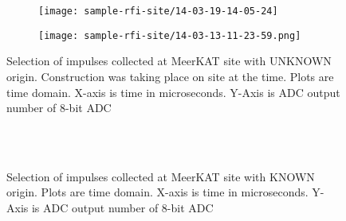 \begin{landscape}
\begin{figure}
{\begin{subfigure}{0.55\textwidth}
      \texttt{[image: sample-rfi-site/14-03-19-14-05-24]}
    \end{subfigure}
    \begin{subfigure}{0.55\textwidth}
      \texttt{[image: sample-rfi-site/14-03-13-11-23-59.png]}
    \end{subfigure}
  }
  \caption{Selection of impulses collected at MeerKAT site with UNKNOWN origin. Construction was taking place on site at the time. Plots are time domain. X-axis is time in microseconds. Y-Axis is ADC output number of 8-bit ADC}
  \label{fig:field-trials:unknown-time-domain}
  \end{figure}
\end{landscape}

\begin{landscape}
  \thispagestyle{empty}
  \begin{figure}
  \centering
   \\[1ex]
   \\[1ex]
  \caption{Selection of impulses collected at MeerKAT site with KNOWN origin. Plots are time domain. X-axis is time in microseconds. Y-Axis is ADC output number of 8-bit ADC}
  \label{fig:field-trials:known-time-domain}
  \end{figure}
\end{landscape}
